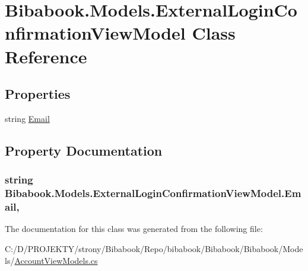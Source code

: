 \hypertarget{class_bibabook_1_1_models_1_1_external_login_confirmation_view_model}{}\section{Bibabook.\+Models.\+External\+Login\+Confirmation\+View\+Model Class Reference}
\label{class_bibabook_1_1_models_1_1_external_login_confirmation_view_model}
\subsection*{Properties}
\begin{DoxyCompactItemize}
\item 
string \hyperlink{class_bibabook_1_1_models_1_1_external_login_confirmation_view_model_a28decc67cc7a5606a4df3e84c4d12c01}{Email}
\end{DoxyCompactItemize}


\subsection{Property Documentation}
\hypertarget{class_bibabook_1_1_models_1_1_external_login_confirmation_view_model_a28decc67cc7a5606a4df3e84c4d12c01}{}
\subsubsection[{Email}]{\setlength{\rightskip}{0pt plus 5cm}string Bibabook.\+Models.\+External\+Login\+Confirmation\+View\+Model.\+Email\hspace{0.3cm}{\ttfamily [get]}, {\ttfamily [set]}}\label{class_bibabook_1_1_models_1_1_external_login_confirmation_view_model_a28decc67cc7a5606a4df3e84c4d12c01}


The documentation for this class was generated from the following file\+:\begin{DoxyCompactItemize}
\item 
C\+:/\+D/\+P\+R\+O\+J\+E\+K\+T\+Y/strony/\+Bibabook/\+Repo/bibabook/\+Bibabook/\+Bibabook/\+Models/\hyperlink{_account_view_models_8cs}{Account\+View\+Models.\+cs}\end{DoxyCompactItemize}
